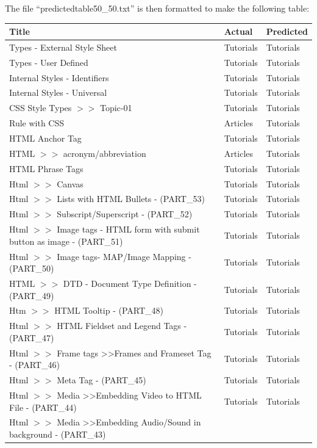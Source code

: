 \documentclass[a4paper, 11pt]{article}
\begin{document}
The file ``predictedtable50\_50.txt'' is then formatted to make the following table:

\begin{longtable}{ |p{10cm}|p{2cm}|p{2cm}| }
\hline
Title
&
Actual
&
Predicted \\
\hline
Types - External Style Sheet
&
Tutorials
&
Tutorials \\
\hline
Types - User Defined
&
Tutorials
&
Tutorials \\
\hline
Internal Styles - Identifiers
&
Tutorials
&
Tutorials \\
\hline
Internal Styles - Universal
&
Tutorials
&
Tutorials \\
\hline
CSS Style Types $>>$ Topic-01
&
Tutorials
&
Tutorials \\
\hline
\rowcolor{LightCyan}
Rule with CSS
&
Articles 
&
Tutorials\\
\hline
HTML Anchor Tag
&
Tutorials
&
Tutorials \\
\hline
\rowcolor{LightCyan}
HTML $>>$ acronym/abbreviation
&
Articles 
&
Tutorials \\
\hline
HTML Phrase Tags
&
Tutorials
&
Tutorials \\
\hline
Html $>>$ Canvas
&
Tutorials
&
Tutorials \\
\hline
Html  $>>$ Lists with HTML Bullets - (PART\_53)
&
Tutorials
&
Tutorials \\
\hline
Html $>>$  Subscript/Superscript - (PART\_52)
&
Tutorials
&
Tutorials \\
\hline
Html $>>$  Image tags - HTML form with submit button as image  - (PART\_51)
&
Tutorials
&
Tutorials \\
\hline
Html $>>$ Image tags- MAP/Image Mapping - (PART\_50)
&
Tutorials
&
Tutorials \\
\hline
HTML $>>$ DTD - Document Type Definition - (PART\_49)
&
Tutorials
&
Tutorials \\
\hline
Htm $>>$ HTML Tooltip  - (PART\_48)
&
Tutorials
&
Tutorials \\
\hline
Html $>>$ HTML Fieldset and Legend Tags  - (PART\_47)
&
Tutorials
&
Tutorials \\
\hline
Html $>>$ Frame tags >>Frames and Frameset Tag - (PART\_46)
&
Tutorials
&
Tutorials \\
\hline
Html $>>$ Meta Tag - (PART\_45)
&
Tutorials
&
Tutorials \\
\hline
Html $>>$ Media >>Embedding Video to HTML File - (PART\_44)
&
Tutorials
&
Tutorials \\
\hline
Html $>>$ Media >>Embedding Audio/Sound in background - (PART\_43)

\end{longtable}
\end{document}

